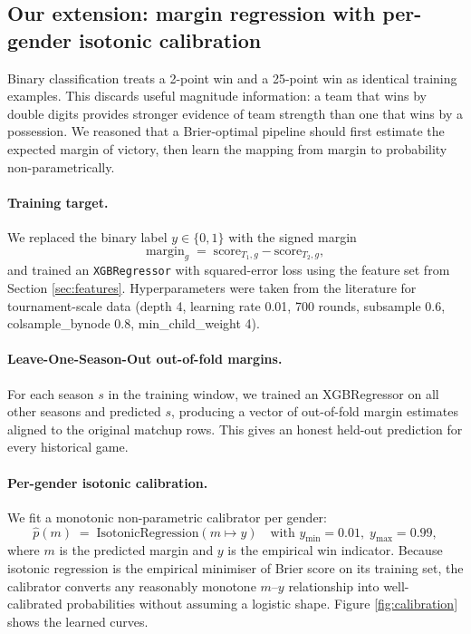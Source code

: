 \documentclass[11pt, a4paper]{article}
\begin{document}
\subsection{Our extension: margin regression with per-gender isotonic calibration}
\label{sec:margin-regression}

Binary classification treats a 2-point win and a 25-point win as identical training examples. This discards useful magnitude information: a team that wins by double digits provides stronger evidence of team strength than one that wins by a possession. We reasoned that a Brier-optimal pipeline should first estimate the expected margin of victory, then learn the mapping from margin to probability non-parametrically.

\paragraph{Training target.} We replaced the binary label $y \in \{0, 1\}$ with the signed margin
\begin{equation}
    \text{margin}_g \;=\; \text{score}_{T_1, g} - \text{score}_{T_2, g},
\end{equation}
and trained an \texttt{XGBRegressor} with squared-error loss using the feature set from Section \ref{sec:features}. Hyperparameters were taken from the literature for tournament-scale data (depth 4, learning rate 0.01, 700 rounds, subsample 0.6, colsample\_bynode 0.8, min\_child\_weight 4).

\paragraph{Leave-One-Season-Out out-of-fold margins.} For each season $s$ in the training window, we trained an XGBRegressor on all other seasons and predicted $s$, producing a vector of out-of-fold margin estimates aligned to the original matchup rows. This gives an honest held-out prediction for every historical game.

\paragraph{Per-gender isotonic calibration.} We fit a monotonic non-parametric calibrator per gender:
\begin{equation}
    \hat{p}(m) \;=\; \mathrm{IsotonicRegression}(m \mapsto y)\quad\text{with } y_\text{min}=0.01,\; y_\text{max}=0.99,
\end{equation}
where $m$ is the predicted margin and $y$ is the empirical win indicator. Because isotonic regression is the empirical minimiser of Brier score on its training set, the calibrator converts any reasonably monotone $m$--$y$ relationship into well-calibrated probabilities without assuming a logistic shape. Figure \ref{fig:calibration} shows the learned curves.
\end{document}
